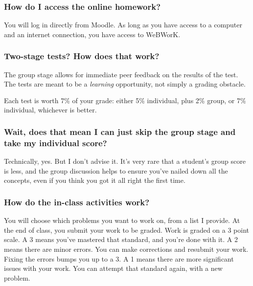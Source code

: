 \documentclass[10pt,]{article}
\begin{document}
\subsubsection[{How do I access the online homework?}]{How do I access the online homework?}\label{subsubsection-15}
\hypertarget{p-22}{}%
You will log in directly from Moodle. As long as you have access to a computer and an internet connection, you have access to WeBWorK.%
%
%
\typeout{************************************************}
\typeout{************************************************}
%
\subsubsection[{Two-stage tests? How does that work?}]{Two-stage tests? How does that work?}\label{subsubsection-16}
\hypertarget{p-23}{}%
The group stage allows for immediate peer feedback on the results of the test. The tests are meant to be a \emph{learning} opportunity, not simply a grading obstacle.%
\par
\hypertarget{p-24}{}%
Each test  is worth 7\%  of your grade: either 5\% individual, plus 2\% group, or 7\% individual, whichever is better.%
%
%
\typeout{************************************************}
\typeout{************************************************}
%
\subsubsection[{Wait, does that mean I can just skip the group stage and take my individual score?}]{Wait, does that mean I can just skip the group stage and take my individual score?}\label{subsubsection-17}
\hypertarget{p-25}{}%
Technically, yes. But I don't advise it. It's very rare that a student's group score is less, and the group discussion helps to ensure you've nailed down all the concepts, even if you think you got it all right the first time.%
%
%
\typeout{************************************************}
\typeout{************************************************}
%
\subsubsection[{How do the in-class activities work?}]{How do the in-class activities work?}\label{subsubsection-18}
\hypertarget{p-26}{}%
You will choose which problems you want to work on, from a list I provide. At the end of class, you submit your work to be graded. Work is graded on a 3 point scale. A 3 means you've mastered that standard, and you're done with it. A 2 means there are minor errors. You can make corrections and resubmit your work. Fixing the errors bumps you up to a 3. A 1 means there are more significant issues with your work. You can attempt that standard again, with a new problem.%
%
%
\typeout{************************************************}
\typeout{************************************************}
%
\end{document}
